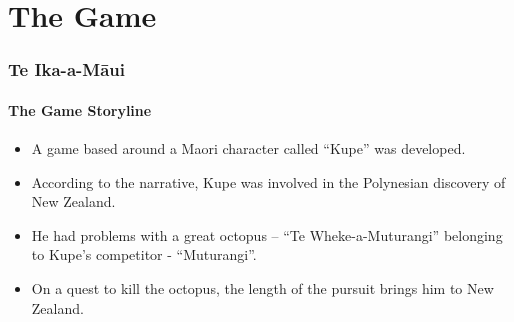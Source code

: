 \documentclass[aspectratio=169]{beamer}
\begin{document}
\section{The Game}
\begin{frame}
\frametitle{Te Ika-a-Māui}
\framesubtitle{The Game Storyline}
\begin{itemize}
\item  A game based around a Maori character called “Kupe” was developed. 
\newline
\item According to the narrative, Kupe was involved in the Polynesian discovery of New Zealand.
\newline	
\item He had problems with a great octopus – “Te Wheke-a-Muturangi” belonging to Kupe's competitor - “Muturangi”.  
\newline	
\item On a quest to kill the octopus, the length of the pursuit brings him to New
Zealand. 	
\end{itemize}
\end{frame}
\end{document}
